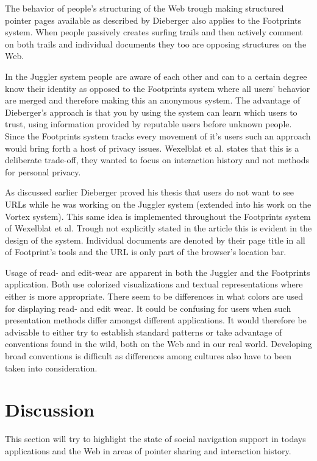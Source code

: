 \documentclass[12pt,a4paper]{article}
\begin{document}
The behavior of people's structuring of the Web trough making structured
pointer pages available as described by Dieberger also applies to the
Footprints system. When people passively creates surfing trails and then
actively comment on both trails and individual documents they too are opposing
structures on the Web.

In the Juggler system people are aware of each other and can to a certain
degree know their identity as opposed to the Footprints system where all
users' behavior are merged and therefore making this an anonymous system. The
advantage of Dieberger's approach is that you by using the system can learn
which users to trust, using information provided by reputable users
before unknown people. Since the Footprints system tracks every movement of
it's users such an approach would bring forth a host of privacy issues.
Wexelblat et al. states that this is a deliberate trade-off, they wanted to
focus on interaction history and not methods for personal privacy.

As discussed earlier Dieberger proved his thesis that users do not want to see
URLs while he was working on the Juggler system (extended into his work on the
Vortex system). This same idea is implemented
throughout the Footprints system of Wexelblat et al.
Trough not explicitly stated in the article this is evident in the design
of the system. Individual documents are denoted by their page title in all of
Footprint's tools and the URL is only part of the browser's location bar.

Usage of read- and edit-wear are apparent in both the Juggler and the
Footprints application. Both use colorized visualizations and textual
representations where either is more appropriate. There seem to be differences
in what colors are used for displaying read- and edit wear. It could be
confusing for users when such presentation methods differ amongst different
applications. It would therefore be advisable to either try to establish
standard patterns or take advantage of conventions found in the wild, both on
the Web and in our real world. Developing broad conventions is difficult as
differences among cultures also have to been taken into consideration.

\section{Discussion}

This section will try to highlight the state of social navigation support in
todays applications and the Web in areas of pointer sharing and interaction
history.
\end{document}
